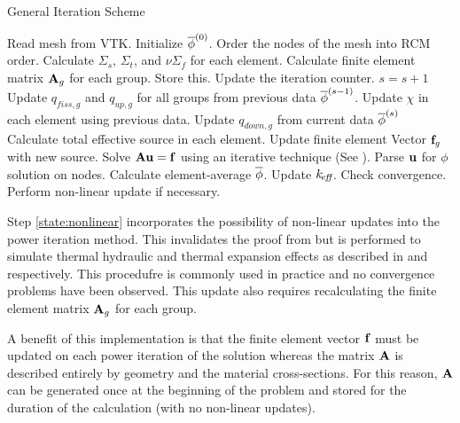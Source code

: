     \begin{algorithm}
      \caption{General Iteration Scheme}
      \label{algorithm:general}
      \begin{algorithmic}[1]
      \State Read mesh from VTK.
      \State Initialize $\overline{\phi}^{(0)}$.
      \State Order the nodes of the mesh into RCM order.
        \label{state:rcm}
      \State Calculate $\Sigma_s$, $\Sigma_t$, and $\nu \Sigma_f$ for each 
        element.
      \State Calculate finite element matrix $\mathbf{A}_g$ for each group. Store this. 
        \label{state:fem_matrix}
        \State Update the iteration counter. $s=s+1$
        \State Update $q_{fiss,g}$ and $q_{up,g}$ for all groups from previous 
          data $\overline{\phi}^{(s-1)}$.
        \State Update $\chi$ in each element using previous data.
          \label{state:chi_collapse}
          \State Update $q_{down,g}$ from current data $\overline{\phi}^{(s)}$
          \State Calculate total effective source in each element.
          \State Update finite element Vector $\mathbf{f}_g$ with new source.
            \label{state:fem_vector}
          \State Solve $\mathbf{A} \mathbf{u} = \mathbf{f}$ using an iterative technique (See
            ).
          \State Parse $\mathbf{u}$ for $\phi$ solution on nodes.
          \State Calculate element-average $\overline{\phi}$.
        \EndFor
        \State Update $k_{\!\mbox{\scriptsize \em eff}}$.
        \State Check convergence.
        \State Perform non-linear update if necessary. \label{state:nonlinear}
      \EndWhile
      \end{algorithmic}
    \end{algorithm}

    Step \ref{state:nonlinear} incorporates the possibility of non-linear
    updates into the power iteration method. This invalidates the proof from
     but is performed to simulate thermal hydraulic
    and thermal expansion effects as described in 
    and  respectively. This procedufre is commonly
    used in practice and no convergence problems have been observed. This update
    also requires recalculating the finite element matrix $\mathbf{A}_g$ for each 
    group.
    
    A benefit of this implementation is that the finite element vector $\mathbf{f}$ 
    must be updated on each power iteration of the solution whereas the matrix 
    $\mathbf{A}$ is described entirely by geometry and the material cross-sections. For
    this reason, $\mathbf{A}$ can be generated once at the beginning of the problem and 
    stored for the duration of the calculation (with no non-linear updates).
    \FloatBarrier %

